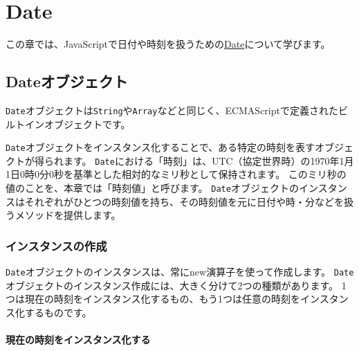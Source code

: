 \hypertarget{date}{%
\chapter{Date}\label{date}}
\thispagestyle{frontheadings}

この章では、JavaScriptで日付や時刻を扱うための\href{https://developer.mozilla.org/ja/docs/Web/JavaScript/Reference/Global_Objects/Date}{Date}について学びます。

\hypertarget{date-object}{%
\section{Dateオブジェクト}\label{date-object}}

\texttt{Date}オブジェクトは\texttt{String}や\texttt{Array}などと同じく、ECMAScriptで定義されたビルトインオブジェクトです。

\texttt{Date}オブジェクトをインスタンス化することで、ある特定の時刻を表すオブジェクトが得られます。
\texttt{Date}における「時刻」は、UTC（協定世界時）の1970年1月1日0時0分0秒を基準とした相対的なミリ秒として保持されます。
このミリ秒の値のことを、本章では「時刻値」と呼びます。
\texttt{Date}オブジェクトのインスタンスはそれぞれがひとつの時刻値を持ち、その時刻値を元に日付や時・分などを扱うメソッドを提供します。

\hypertarget{create-instance}{%
\subsection{インスタンスの作成}\label{create-instance}}

\texttt{Date}オブジェクトのインスタンスは、常にnew演算子を使って作成します。
\texttt{Date}オブジェクトのインスタンス作成には、大きく分けて2つの種類があります。
1つは現在の時刻をインスタンス化するもの、もう1つは任意の時刻をインスタンス化するものです。

\hypertarget{instance-current-time}{%
\subsubsection{現在の時刻をインスタンス化する}\label{instance-current-time}}


